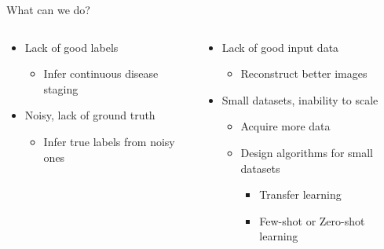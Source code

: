 \documentclass[8pt,xcolor=table]{beamer}
\begin{document}
\begin{frame}{What can we do?}


\vspace{-3em}
\begin{columns}[t]
\begin{column}{0.5\textwidth}
\centering

\begin{itemize}
\item Lack of good labels
\begin{itemize}
 \item Infer continuous disease staging
 
\end{itemize}

 \vspace{2em}
 
 \item Noisy, lack of ground truth
\begin{itemize}
   \item Infer true labels from noisy ones  
\end{itemize}

\end{itemize}

\vspace{2em}


\end{column}
\begin{column}{0.5\textwidth}
\centering


\begin{itemize}
\item Lack of good input data

\begin{itemize}
  \item Reconstruct better images
\end{itemize}

\vspace{0.5em}

\item Small datasets, inability to scale 
\begin{itemize}
\item Acquire more data
\item Design algorithms for small datasets
\begin{itemize}
 \item Transfer learning
 \item Few-shot or Zero-shot learning
\end{itemize}


\end{itemize}
\end{itemize}
\end{column}
\end{columns}
\end{frame}
\end{document}
